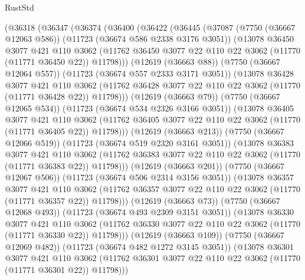 \begin{lexlean}{RustStd}
\begin{coremodule}
      (@36318
        (@36347
          (@36374
            (@36400
              (@36422
                (@36445
                  (@37087
                    (@7750 (@36667 @12063 @586))
                    (@11723 (@36674 @586 @2338 @3176 @3051))
                    (@13078
                      @36450
                      @3077
                      @421
                      @110
                      @3062
                      (@11762 @36450 @3077 @22 @110 @22 @3062 (@11770 (@11771 @36450 @22)) @11798)))
                  (@12619 (@36663 @88))
                  (@7750 (@36667 @12064 @557))
                  (@11723 (@36674 @557 @2333 @3171 @3051))
                  (@13078
                    @36428
                    @3077
                    @421
                    @110
                    @3062
                    (@11762 @36428 @3077 @22 @110 @22 @3062 (@11770 (@11771 @36428 @22)) @11798)))
                (@12619 (@36663 @79))
                (@7750 (@36667 @12065 @534))
                (@11723 (@36674 @534 @2326 @3166 @3051))
                (@13078
                  @36405
                  @3077
                  @421
                  @110
                  @3062
                  (@11762 @36405 @3077 @22 @110 @22 @3062 (@11770 (@11771 @36405 @22)) @11798)))
              (@12619 (@36663 @213))
              (@7750 (@36667 @12066 @519))
              (@11723 (@36674 @519 @2320 @3161 @3051))
              (@13078
                @36383
                @3077
                @421
                @110
                @3062
                (@11762 @36383 @3077 @22 @110 @22 @3062 (@11770 (@11771 @36383 @22)) @11798)))
            (@12619 (@36663 @201))
            (@7750 (@36667 @12067 @506))
            (@11723 (@36674 @506 @2314 @3156 @3051))
            (@13078
              @36357
              @3077
              @421
              @110
              @3062
              (@11762 @36357 @3077 @22 @110 @22 @3062 (@11770 (@11771 @36357 @22)) @11798)))
          (@12619 (@36663 @73))
          (@7750 (@36667 @12068 @493))
          (@11723 (@36674 @493 @2309 @3151 @3051))
          (@13078
            @36330
            @3077
            @421
            @110
            @3062
            (@11762 @36330 @3077 @22 @110 @22 @3062 (@11770 (@11771 @36330 @22)) @11798)))
        (@12619 (@36663 @109))
        (@7750 (@36667 @12069 @482))
        (@11723 (@36674 @482 @1272 @3145 @3051))
        (@13078
          @36301
          @3077
          @421
          @110
          @3062
          (@11762 @36301 @3077 @22 @110 @22 @3062 (@11770 (@11771 @36301 @22)) @11798)))

\end{coremodule}
\end{lexlean}
